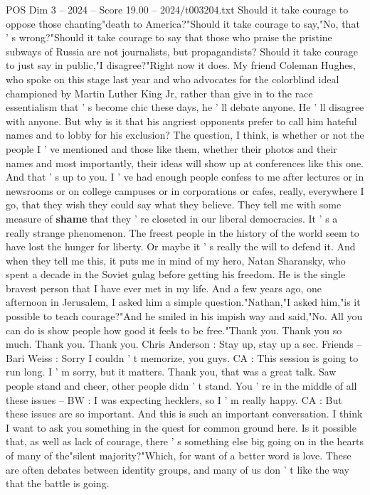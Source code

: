\begin{textsample}{POS Dim 3 – 2024 – Score 19.00 – 2024/t003204.txt}
Should it take courage to oppose those chanting"death to America?"Should it take courage to say,"No, that ' s wrong?"Should it take courage to say that those who praise the pristine subways of Russia are not journalists, but propagandists?
Should it take courage to just say in public,"I disagree?"Right now it does.
My friend Coleman Hughes, who spoke on this stage last year and who advocates for the colorblind ideal championed by Martin Luther King Jr, rather than give in to the race essentialism that ' s become chic these days, he ' ll debate anyone.
He ' ll disagree with anyone.
But why is it that his angriest opponents prefer to call him hateful names and to lobby for his exclusion?
The question, I think, is whether or not the people I ' ve mentioned and those like them, whether their photos and their names and most importantly, their ideas will show up at conferences like this one.
And that ' s up to you.
I ' ve had enough people confess to me after lectures or in newsrooms or on college campuses or in corporations or cafes, really, everywhere I go, that they wish they could say what they believe.
They tell me with some measure of \textbf{shame} that they ' re closeted in our liberal democracies.
It ' s a really strange phenomenon.
The freest people in the history of the world seem to have lost the hunger for liberty.
Or maybe it ' s really the will to defend it.
And when they tell me this, it puts me in mind of my hero, Natan Sharansky, who spent a decade in the Soviet gulag before getting his freedom.
He is the single bravest person that I have ever met in my life.
And a few years ago, one afternoon in Jerusalem, I asked him a simple question."Nathan,"I asked him,"is it possible to teach courage?"And he smiled in his impish way and said,"No.
All you can do is show people how good it feels to be free."Thank you.
Thank you so much.
Thank you.
Thank you.
Chris Anderson : Stay up, stay up a sec.
Friends -- Bari Weiss : Sorry I couldn ' t memorize, you guys.
CA : This session is going to run long.
I ' m sorry, but it matters.
Thank you, that was a great talk.
Saw people stand and cheer, other people didn ' t stand.
You ' re in the middle of all these issues -- BW : I was expecting hecklers, so I ' m really happy.
CA : But these issues are so important.
And this is such an important conversation.
I think I want to ask you something in the quest for common ground here.
Is it possible that, as well as lack of courage, there ' s something else big going on in the hearts of many of the"silent majority?"Which, for want of a better word is love.
These are often debates between identity groups, and many of us don ' t like the way that the battle is going.

\end{textsample}
